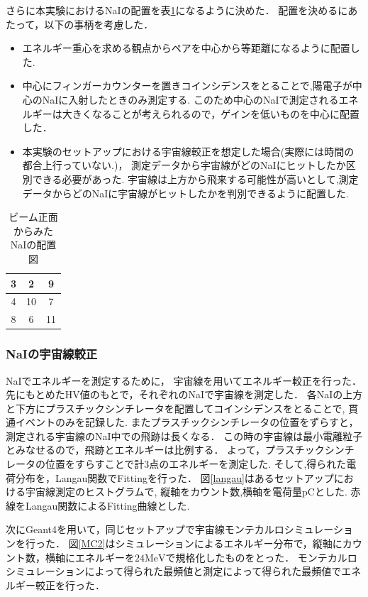 さらに本実験におけるNaIの配置を表\ref{haichi}になるように決めた．
配置を決めるにあたって，以下の事柄を考慮した．
\begin{itemize}
\item エネルギー重心を求める観点からペアを中心から等距離になるように配置した.
\item 中心にフィンガーカウンターを置きコインシデンスをとることで,陽電子が中心のNaIに入射したときのみ測定する.
  このため中心のNaIで測定されるエネルギーは大きくなることが考えられるので，ゲインを低いものを中心に配置した．
\item 本実験のセットアップにおける宇宙線較正を想定した場合(実際には時間の都合上行っていない.)，
  測定データから宇宙線がどのNaIにヒットしたか区別できる必要があった.
  宇宙線は上方から飛来する可能性が高いとして,測定データからどのNaIに宇宙線がヒットしたかを判別できるように配置した.
\end{itemize}
\begin{table}[H]
  \begin{center}
    \caption{ビーム正面からみたNaIの配置図}\label{haichi}
    \begin{tabular}{|c|c|c|}\hline 
      \cellcolor{yellow}3&\cellcolor{red}2&\cellcolor{yellow}9\\ \hline
      \cellcolor{cyan}4&10&\cellcolor{red}7\\ \hline
      \cellcolor{green}8&\cellcolor{cyan}6&\cellcolor{green}11\\ \hline
    \end{tabular}
  \end{center}
\end{table}
\newpage
\subsubsection{NaIの宇宙線較正}
NaIでエネルギーを測定するために， 宇宙線を用いてエネルギー較正を行った．
先にもとめたHV値のもとで，それぞれのNaIで宇宙線を測定した．
各NaIの上方と下方にプラスチックシンチレータを配置してコインシデンスをとることで,
貫通イベントのみを記録した.
またプラスチックシンチレータの位置をずらすと，測定される宇宙線のNaI中での飛跡は長くなる．
この時の宇宙線は最小電離粒子とみなせるので，飛跡とエネルギーは比例する．
よって，プラスチックシンチレータの位置をすらすことで計3点のエネルギーを測定した.
そして,得られた電荷分布を，Langau関数でFittingを行った．
図\ref{langau}はあるセットアップにおける宇宙線測定のヒストグラムで,
縦軸をカウント数,横軸を電荷量$\mathrm{pC}$とした.
赤線をLangau関数によるFitting曲線とした.

次にGeant4を用いて，同じセットアップで宇宙線モンテカルロシミュレーションを行った．
図\ref{MC2}はシミュレーションによるエネルギー分布で，縦軸にカウント数，横軸にエネルギーを$24\mathrm{MeV}$で規格化したものをとった．
モンテカルロシミュレーションによって得られた最頻値と測定によって得られた最頻値でエネルギー較正を行った．

